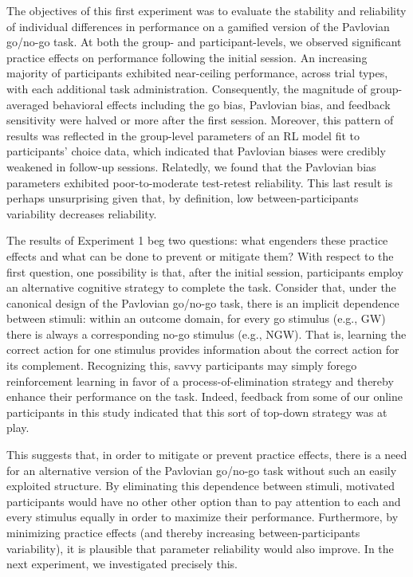 \documentclass[a4paper,12pt]{article}
\begin{document}
\begin{refsection}[main]
The objectives of this first experiment was to evaluate the stability and reliability of individual differences in performance on a gamified version of the Pavlovian go/no-go task. At both the group- and participant-levels, we observed significant practice effects on performance following the initial session. An increasing majority of participants exhibited near-ceiling performance, across trial types, with each additional task administration. Consequently, the magnitude of group-averaged behavioral effects including the go bias, Pavlovian bias, and feedback sensitivity were halved or more after the first session. Moreover, this pattern of results was reflected in the group-level parameters of an RL model fit to participants' choice data, which indicated that Pavlovian biases were credibly weakened in follow-up sessions. Relatedly, we found that the Pavlovian bias parameters exhibited poor-to-moderate test-retest reliability. This last result is perhaps unsurprising given that, by definition, low between-participants variability decreases reliability.  

The results of Experiment 1 beg two questions: what engenders these practice effects and what can be done to prevent or mitigate them? With respect to the first question, one possibility is that, after the initial session, participants employ an alternative cognitive strategy to complete the task. Consider that, under the canonical design of the Pavlovian go/no-go task, there is an implicit dependence between stimuli: within an outcome domain, for every go stimulus (e.g., GW) there is always a corresponding no-go stimulus (e.g., NGW). That is, learning the correct action for one stimulus provides information about the correct action for its complement. Recognizing this, savvy participants may simply forego reinforcement learning in favor of a process-of-elimination strategy and thereby enhance their performance on the task. Indeed, feedback from some of our online participants in this study indicated that this sort of top-down strategy was at play.  

This suggests that, in order to mitigate or prevent practice effects, there is a need for an alternative version of the Pavlovian go/no-go task without such an easily exploited structure. By eliminating this dependence between stimuli, motivated participants would have no other other option than to pay attention to each and every stimulus equally in order to maximize their performance. Furthermore, by minimizing practice effects (and thereby increasing between-participants variability), it is plausible that parameter reliability would also improve. In the next experiment, we investigated precisely this.


\end{refsection}
\end{document}
